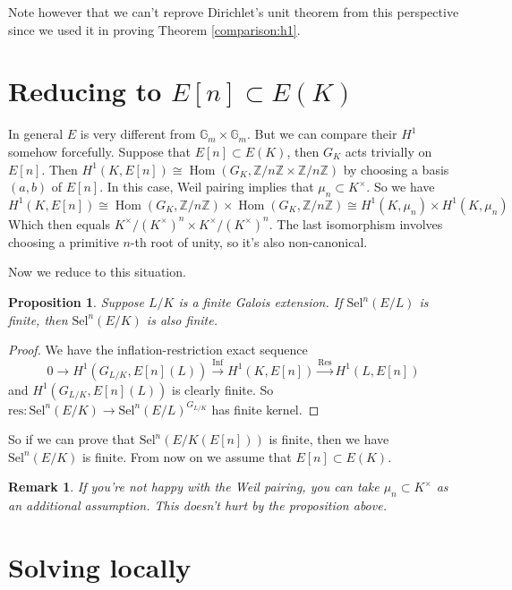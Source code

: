 \documentclass{article}
\newtheorem{rmk}[thm]{Remark}
\newtheorem{prop}[thm]{Proposition}
\newcommand{\mn}{\mu_{n}}
\newcommand{\kmkn}{K ^{\times} / (K ^{\times})^{n}}
\DeclareMathOperator{\hhom}{Hom}
\begin{document}
Note however that we can't reprove Dirichlet's unit theorem from this perspective
since we used it in proving Theorem \ref{comparison:h1}.

\section{Reducing to $ E [n]\subset E (K) $}

In general $ E $ is very different from $ \mathbb{G}_{m}\times \mathbb{G}_{m} $.
But we can compare their $ H ^{1} $ somehow forcefully.
Suppose that $ E [n] \subset E (K) $, then $ G _{K} $ acts trivially on $ E [n] $.
Then $ H ^{1}(K, E [n]) \cong \hhom (G _{K}, \mathbb{Z}/n \mathbb{Z} \times \mathbb{Z}/n \mathbb{Z})$
by choosing a basis $ (a, b) $ of $ E [n] $.
In this case, Weil pairing implies that $ \mn \subset K ^{\times} $.
So we have
$$ H ^{1}(K, E [n]) \cong \hhom (G _{K}, \mathbb{Z}/n \mathbb{Z})\times
\hhom (G _{K}, \mathbb{Z}/n \mathbb{Z})\cong H ^{1}(K, \mn)\times H ^{1}(K, \mn)
$$
Which then equals $ \kmkn\times \kmkn $. The last isomorphism involves
choosing a primitive $ n $-th root of unity, so it's also non-canonical.

Now we reduce to this situation.
\begin{prop}
Suppose $ L/K $ is a finite Galois extension.
If $ \mathrm{Sel}^{n}(E/L) $ is finite, then
$ \mathrm{Sel}^{n}(E/K) $ is also finite.
\end{prop}

\begin{proof}
We have the inflation-restriction exact sequence
$$ 0\to H ^{1}(G _{L/K}, E [n](L))\xrightarrow{\mathrm{Inf}}
H ^{1}(K, E [n]) \xrightarrow{\mathrm{Res}}
H ^{1}(L, E [n])$$
and $ H ^{1}(G _{L/K}, E [n](L)) $ is clearly finite.
So $ \mathrm{res}: \mathrm{Sel}^{n}(E/K)\to \mathrm{Sel}^{n}(E/L)^{G _{L/K}} $
has finite kernel.
\end{proof}

So if we can prove that $ \mathrm{Sel}^{n}(E/K (E [n])) $ is finite,
then we have $ \mathrm{Sel}^{n}(E/K) $ is finite.
From now on we assume that $ E [n]\subset E (K) $.
\begin{rmk}
If you're not happy with the Weil pairing, you can take $ \mn \subset K ^{\times} $ as an
additional assumption. This doesn't hurt by the proposition above.
\end{rmk}

\section{Solving locally}
\end{document}
